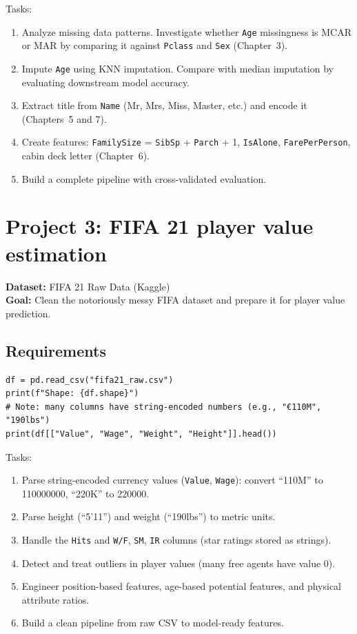 Tasks:
\begin{enumerate}
  \item Analyze missing data patterns. Investigate whether \texttt{Age} missingness is MCAR or MAR by comparing it against \texttt{Pclass} and \texttt{Sex} (Chapter~3).
  \item Impute \texttt{Age} using KNN imputation. Compare with median imputation by evaluating downstream model accuracy.
  \item Extract title from \texttt{Name} (Mr, Mrs, Miss, Master, etc.) and encode it (Chapters~5 and 7).
  \item Create features: \texttt{FamilySize} = \texttt{SibSp} + \texttt{Parch} + 1, \texttt{IsAlone}, \texttt{FarePerPerson}, cabin deck letter (Chapter~6).
  \item Build a complete pipeline with cross-validated evaluation.
\end{enumerate}

\section{Project 3: FIFA 21 player value estimation}

\textbf{Dataset:} FIFA 21 Raw Data (Kaggle)\\
\textbf{Goal:} Clean the notoriously messy FIFA dataset and prepare it for player value prediction.

\subsection{Requirements}

\begin{verbatim}
df = pd.read_csv("fifa21_raw.csv")
print(f"Shape: {df.shape}")
# Note: many columns have string-encoded numbers (e.g., "€110M", "190lbs")
print(df[["Value", "Wage", "Weight", "Height"]].head())
\end{verbatim}

Tasks:
\begin{enumerate}
  \item Parse string-encoded currency values (\texttt{Value}, \texttt{Wage}): convert ``\texteuro110M'' to 110000000, ``\texteuro220K'' to 220000.
  \item Parse height (``5'11'') and weight (``190lbs'') to metric units.
  \item Handle the \texttt{Hits} and \texttt{W/F}, \texttt{SM}, \texttt{IR} columns (star ratings stored as strings).
  \item Detect and treat outliers in player values (many free agents have value 0).
  \item Engineer position-based features, age-based potential features, and physical attribute ratios.
  \item Build a clean pipeline from raw CSV to model-ready features.
\end{enumerate}

